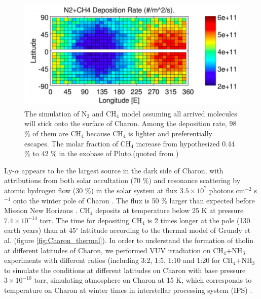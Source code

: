 \begin{figure}
\centering
\includegraphics[width=\textwidth]{figures/chapter1/methane.png}
\caption{The simulation of N$_2$ and CH$_4$ model assuming all arrived molecules will stick onto the surface of Charon. Among the deposition rate, 98 \% of them are CH$_4$ because CH$_4$ is lighter and preferentially escapes. The molar fraction of CH$_4$ increase from hypothesized 0.44 \% to 42 \% in the exobase of Pluto.(quoted from \cite{hoey2017rarefied})}
\label{fig:Charon_distribution}
\end{figure}

Ly-$\alpha$ appears to be the largest source in the dark side of Charon, with attributions from both solar occultation (70 \%) and resonance scattering by atomic hydrogen flow (30 \%) in the solar system at flux $3.5 \times 10^7$ photons cm$^{-2}$ s$^{-1}$ onto the winter pole of Charon \cite{grundy2016formation}. The flux is 50 \% larger than expected before Mission New Horizons \cite{gladstone2015lyalpha}. CH$_4$ deposits at temperature below 25 K at pressure $7.4 \times 10^{-14}$ torr. The time for depositing CH$_4$ is 2 times longer at the pole (130 earth years) than at 45$^{\circ}$ lattitude according to the thermal model of Grundy et al. \cite{grundy2016formation} (figure \ref{fig:Charon_thermal}). In order to understand the formation of tholin at different latitudes of Charon, we performed VUV irradiation on CH$_4$+NH$_3$ experiments with different ratios (including 3:2, 1:5, 1:10 and 1:20 for CH$_4$+NH$_3$ to simulate the conditions at different latitudes on Charon with base pressure $3 \times 10^{-10}$ torr, simulating atmosphere on Charon at 15 K, which corresponds to temperature on Charon at winter times \cite{grundy2016formation} in interstellar processing system (IPS) \cite{chen2013vacuum}.

